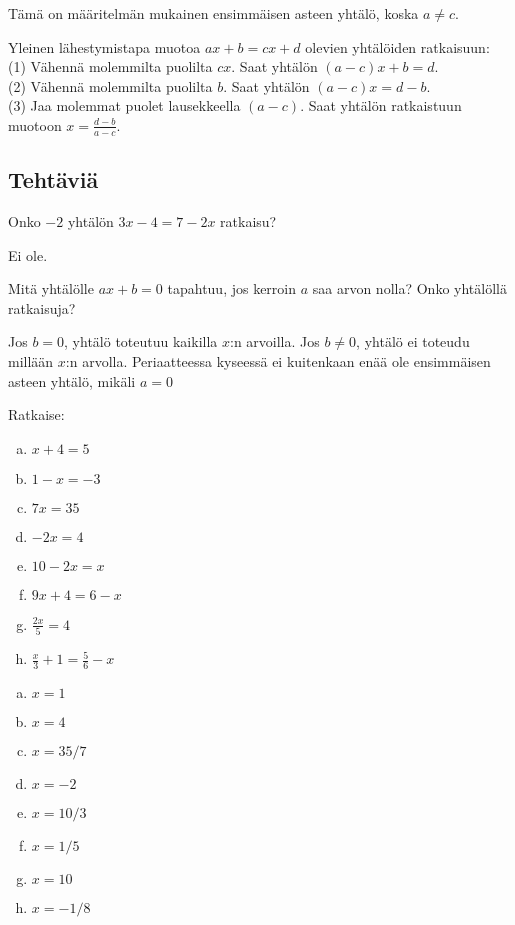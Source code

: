 Tämä on määritelmän mukainen ensimmäisen asteen yhtälö, koska $a \neq c$.

\begin{esimerkki}
Yleinen lähestymistapa muotoa $ax+b = cx+d$ olevien yhtälöiden ratkaisuun: \\
(1) Vähennä molemmilta puolilta $cx$. Saat yhtälön $(a-c)x + b = d$. \\
(2) Vähennä molemmilta puolilta $b$. Saat yhtälön $(a-c)x = d-b$. \\
(3) Jaa molemmat puolet lausekkeella $(a-c)$. Saat yhtälön ratkaistuun muotoon $x = \frac{d-b}{a-c}$.
\end{esimerkki}

\subsection*{Tehtäviä}

\begin{tehtava}
Onko $-2$ yhtälön $3x-4 = 7-2x$ ratkaisu?
\begin{vastaus}
Ei ole.
\end{vastaus}
\end{tehtava}

\begin{tehtava}
Mitä yhtälölle $ax+b = 0$ tapahtuu, jos kerroin $a$ saa arvon nolla?
Onko yhtälöllä ratkaisuja?
\begin{vastaus}
Jos $b = 0$, yhtälö toteutuu kaikilla $x$:n arvoilla. Jos $b \neq 0$, yhtälö
ei toteudu millään $x$:n arvolla. Periaatteessa kyseessä ei kuitenkaan
enää ole ensimmäisen asteen yhtälö, mikäli $a = 0$
\end{vastaus}
\end{tehtava}

\begin{tehtava}
%
Ratkaise:
\begin{enumerate}[a)]
\item $x + 4 = 5$
\item $1 - x = -3$
\item $7x = 35$
\item $-2x = 4$
\item $10 - 2x = x$
\item $9x + 4 = 6 - x$
\item $\frac{2x}{5} = 4$
\item $\frac{x}{3} + 1 = \frac{5}{6} - x$
\end{enumerate}
\begin{vastaus}
\begin{enumerate}[a)]
\item $x=1$
\item $x=4$
\item $x=35/7$
\item $x=-2$
\item $x=10/3$
\item $x=1/5$
\item $x=10$
\item $x=-1/8$
\end{enumerate}
\end{vastaus}
\end{tehtava}

